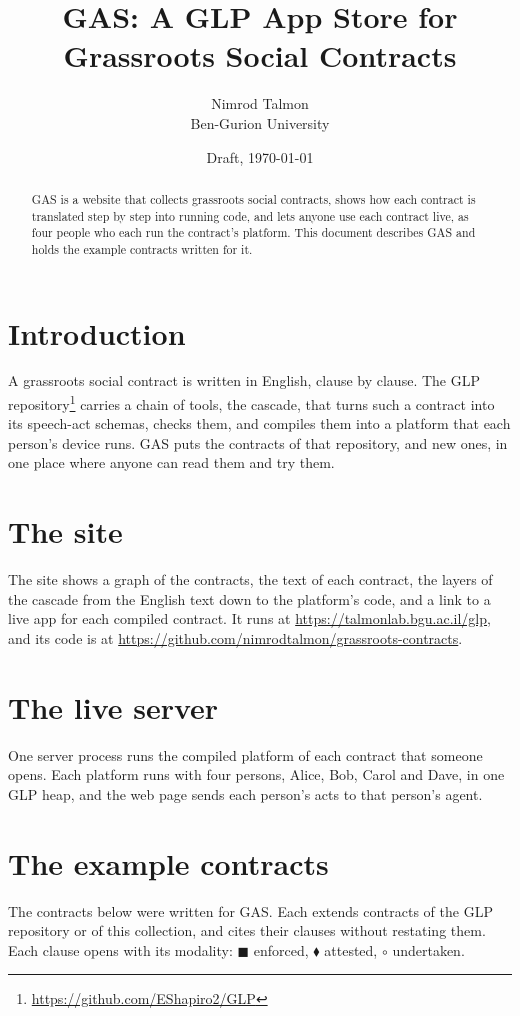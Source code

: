 \documentclass[11pt]{article}
\title{GAS: A GLP App Store for Grassroots Social Contracts}
\author{Nimrod Talmon\\Ben-Gurion University}
\date{Draft, \today}
\begin{document}
\maketitle

\begin{abstract}
GAS is a website that collects grassroots social contracts, shows how each contract is translated step by step into running code, and lets anyone use each contract live, as four people who each run the contract's platform.
This document describes GAS and holds the example contracts written for it.
\end{abstract}

\section{Introduction}

A grassroots social contract is written in English, clause by clause.
The GLP repository\footnote{\url{https://github.com/EShapiro2/GLP}} carries a chain of tools, the cascade, that turns such a contract into its speech-act schemas, checks them, and compiles them into a platform that each person's device runs.
GAS puts the contracts of that repository, and new ones, in one place where anyone can read them and try them.

\section{The site}

The site shows a graph of the contracts, the text of each contract, the layers of the cascade from the English text down to the platform's code, and a link to a live app for each compiled contract.
It runs at \url{https://talmonlab.bgu.ac.il/glp}, and its code is at \url{https://github.com/nimrodtalmon/grassroots-contracts}.

\section{The live server}

One server process runs the compiled platform of each contract that someone opens.
Each platform runs with four persons, Alice, Bob, Carol and Dave, in one GLP heap, and the web page sends each person's acts to that person's agent.

\section{The example contracts}

The contracts below were written for GAS.
Each extends contracts of the GLP repository or of this collection, and cites their clauses without restating them.
Each clause opens with its modality: $\blacksquare$ enforced, $\blacklozenge$ attested, $\circ$ undertaken.


\end{document}
